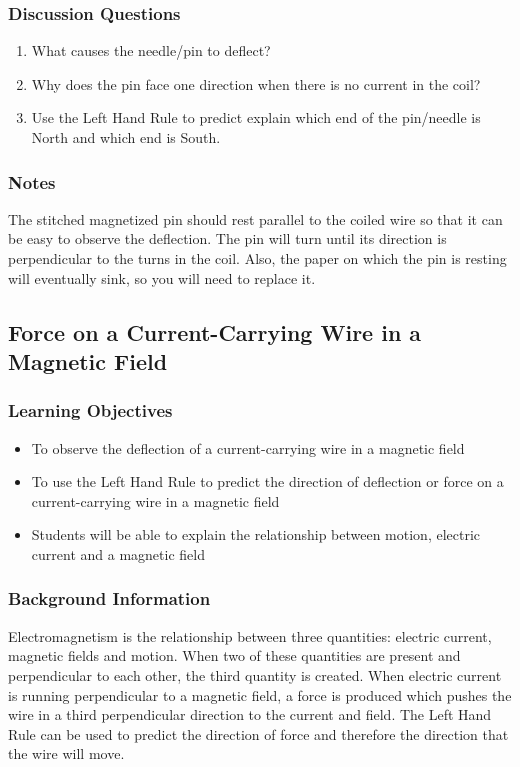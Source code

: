 \subsubsection*{Discussion Questions}
\begin{enumerate}
\item{What causes the needle/pin to deflect?}
\item{Why does the pin face one direction when there is no current in the coil?}
\item{Use the Left Hand Rule to predict explain which end of the pin/needle is North and which end is South.} 
\end{enumerate}

\subsubsection*{Notes}
The stitched magnetized pin should rest parallel to the coiled wire so that it can be easy to observe the deflection. The pin will turn until its direction is perpendicular to the turns in the coil. Also, the paper on which the pin is resting will eventually sink, so you will need to replace it.  

\subsection{Force on a Current-Carrying Wire in a Magnetic Field}

\subsubsection*{Learning Objectives}
\begin{itemize}
\item{To observe the deflection of a current-carrying wire in a magnetic field} 
\item{To use the Left Hand Rule to predict the direction of deflection or force on a current-carrying wire in a magnetic field} 
\item{Students will be able to explain the relationship between motion, electric current and a magnetic field}
\end{itemize}

\subsubsection*{Background Information}
Electromagnetism is the relationship between three quantities: electric current, magnetic fields and motion. When two of these quantities are present and perpendicular to each other, the third quantity is created. When electric current is running perpendicular to a magnetic field, a force is produced which pushes the wire in a third perpendicular direction to the current and field. The Left Hand Rule can be used to predict the direction of force and therefore the direction that the wire will move.  

